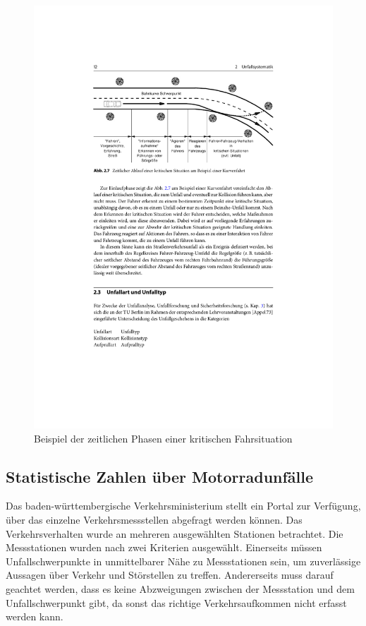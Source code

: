 \begin{figure}
	\centering
	\includegraphics[width=\linewidth]{Bilder/Unfallforschung_2.pdf}
	\caption{Beispiel der zeitlichen Phasen einer kritischen Fahrsituation \citep{Appel2002}}
	\label{fig:BeispielZeitlichePhasenEinesUnfalls}
\end{figure}

%
%
%
%
%

\subsection{Statistische Zahlen über Motorradunfälle}
Das baden-württembergische Verkehrsministerium stellt ein Portal zur Verfügung, über das einzelne Verkehrsmessstellen abgefragt werden können. Das Verkehrsverhalten wurde an mehreren ausgewählten Stationen betrachtet. Die Messstationen wurden nach zwei Kriterien ausgewählt. Einerseits müssen Unfallschwerpunkte in unmittelbarer Nähe zu Messstationen sein, um zuverlässige Aussagen über Verkehr und Störstellen zu treffen.
Andererseits muss darauf geachtet werden, dass es keine Abzweigungen zwischen der Messstation und dem Unfallschwerpunkt gibt, da sonst das richtige Verkehrsaufkommen nicht erfasst werden kann.

